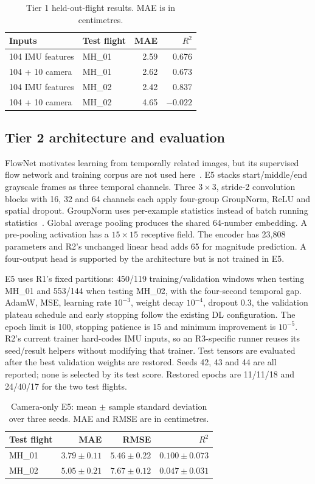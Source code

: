 \begin{table}[t]
\centering
\caption{Tier 1 held-out-flight results. MAE is in centimetres.}
\label{tab:r3tier1}
\begin{tabular}{llrr}
\hline
Inputs & Test flight & MAE & $R^2$ \\
\hline
104 IMU features & MH\_01 & 2.59 & 0.676 \\
104 + 10 camera & MH\_01 & 2.62 & 0.673 \\
104 IMU features & MH\_02 & 2.42 & 0.837 \\
104 + 10 camera & MH\_02 & 4.65 & $-0.022$ \\
\hline
\end{tabular}
\end{table}

\subsection{Tier 2 architecture and evaluation}
FlowNet motivates learning from temporally related images, but its
supervised flow network and training corpus are not used
here~\cite{r3dosovitskiy2015}. E5 stacks start/middle/end grayscale frames as
three temporal channels. Three $3\times3$, stride-2 convolution blocks with
16, 32 and 64 channels each apply four-group GroupNorm, ReLU and spatial
dropout. GroupNorm uses per-example statistics instead of batch running
statistics~\cite{r3wu2018}. Global average pooling produces the shared
64-number embedding. A pre-pooling activation has a $15\times15$ receptive
field. The encoder has 23,808 parameters and R2's unchanged linear head
adds 65 for magnitude prediction. A four-output head is supported by the
architecture but is not trained in E5.

E5 uses R1's fixed partitions: 450/119 training/validation windows when
testing MH\_01 and 553/144 when testing MH\_02, with the four-second temporal
gap. AdamW, MSE, learning rate $10^{-3}$, weight decay $10^{-4}$, dropout 0.3,
the validation plateau schedule and early stopping follow the existing DL
configuration. The epoch limit is 100, stopping patience is 15 and minimum
improvement is $10^{-5}$. R2's current trainer hard-codes IMU inputs, so an
R3-specific runner reuses its seed/result helpers without modifying that
trainer. Test tensors are evaluated after the best validation weights are
restored. Seeds 42, 43 and 44 are all reported; none is selected by its test
score. Restored epochs are 11/11/18 and 24/40/17 for the two test flights.

\begin{table}[t]
\centering
\caption{Camera-only E5: mean $\pm$ sample standard deviation over three
seeds. MAE and RMSE are in centimetres.}
\label{tab:r3e5}
\begin{tabular}{lrrr}
\hline
Test flight & MAE & RMSE & $R^2$ \\
\hline
MH\_01 & $3.79\pm0.11$ & $5.46\pm0.22$ & $0.100\pm0.073$ \\
MH\_02 & $5.05\pm0.21$ & $7.67\pm0.12$ & $0.047\pm0.031$ \\
\hline
\end{tabular}
\end{table}

